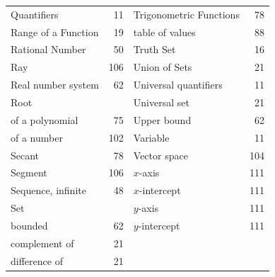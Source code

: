 \begin{tabular}{l r l r}
Quantifiers&11&Trigonometric Functions&78\\
Range of a Function&19&\q table of values&88\\
Rational Number&50&Truth Set&16\\
Ray&106&Union of Sets&21\\
Real number system&62&Universal quantifiers&11\\
Root &&Universal set &21\\
\q of a polynomial& 75& Upper bound &62\\
\q of a number& 102& Variable& 11\\
Secant& 78& Vector space& 104\\
Segment& 106& $x$-axis &111\\
Sequence, infinite& 48& $x$-intercept& 111\\
Set && $y$-axis& 111\\
\q bounded &62& $y$-intercept &111\\
\q complement of &21&&\\
\q difference of &21&&\\
\end{tabular}









%


